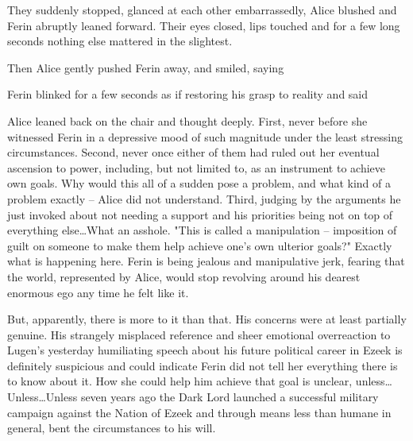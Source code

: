They suddenly stopped, glanced at each other embarrassedly, Alice blushed and Ferin abruptly leaned forward. Their eyes closed, lips touched and for a few long seconds nothing else mattered in the slightest.

Then Alice gently pushed Ferin away, and smiled, saying 

Ferin blinked for a few seconds as if restoring his grasp to reality and said 

Alice leaned back on the chair and thought deeply. First, never before she witnessed Ferin in a depressive mood of such magnitude under the least stressing circumstances. Second, never once either of them had ruled out her eventual ascension to power, including, but not limited to, as an instrument to achieve own goals. Why would this all of a sudden pose a problem, and what kind of a problem exactly -- Alice did not understand. Third, judging by the arguments he just invoked about not needing a support and his priorities being not on top of everything else\dots What an asshole. "This is called a manipulation -- imposition of guilt on someone to make them help achieve one's own ulterior goals?" Exactly what is happening here. Ferin is being jealous and manipulative jerk, fearing that the world, represented by Alice, would stop revolving around his dearest enormous ego any time he felt like it.

But, apparently, there is more to it than that. His concerns were at least partially genuine. His strangely misplaced reference and sheer emotional overreaction to Lugen's yesterday humiliating speech about his future political career in Ezeek is definitely suspicious and could indicate Ferin did not tell her everything there is to know about it. How she could help him achieve that goal is unclear, unless\dots Unless\dots Unless seven years ago the Dark Lord launched a successful military campaign against the Nation of Ezeek and through means less than humane in general, bent the circumstances to his will.

